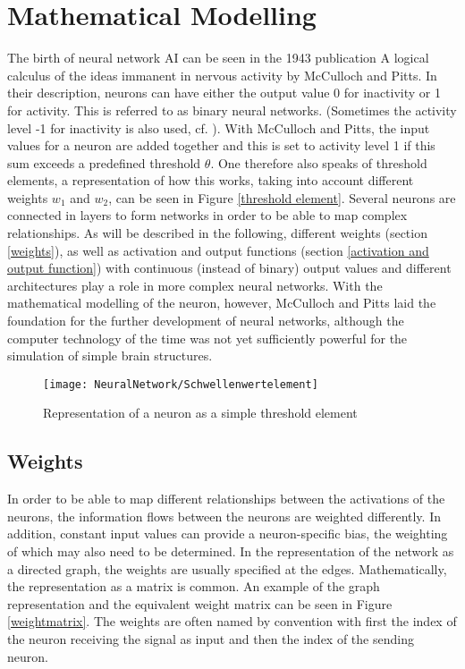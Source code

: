 \section{Mathematical Modelling} 

The birth of neural network AI can be seen in the 1943 publication \glqq A logical calculus of the ideas immanent in nervous activity\grqq \cite{McCulloch:1943} by McCulloch and Pitts. In their description, neurons can have either the output value 0 for inactivity or 1 for activity. This is referred to as binary neural networks. (Sometimes the activity level -1 for inactivity is also used, cf. \cite{Ertel:2016}). With McCulloch and Pitts, the input values for a neuron are added together and this is set to activity level 1 if this sum exceeds a predefined threshold $\theta$. One therefore also speaks of \glqq threshold elements\grqq \cite{Kruse:2015}, a representation of how this works, taking into account different weights $w_1$ and $w_2$, can be seen in Figure \ref{threshold element}. Several neurons are connected in layers to form networks in order to be able to map complex relationships. As will be described in the following, different weights (section \ref{weights}), as well as activation and output functions (section \ref{activation and output function}) with continuous (instead of binary) output values and different architectures play a role in more complex neural networks. With the mathematical modelling of the neuron, however, McCulloch and Pitts laid the foundation for the further development of neural networks, although the computer technology of the time was not yet sufficiently powerful for the simulation of simple brain structures. \cite{Ertel:2016}

\begin{figure}[H]
	\begin{center}
		\texttt{[image: NeuralNetwork/Schwellenwertelement]}
		\caption{Representation of a neuron as a simple threshold element} 
		\label{Schwellenwertelement}
	\end{center}
\end{figure}

\subsection{Weights} \label{Gewichte}

In order to be able to map different relationships between the activations of the neurons, the information flows between the neurons are weighted differently. In addition, constant input values can provide a neuron-specific bias, the weighting of which may also need to be determined. \cite{Moeser:2018} In the representation of the network as a directed graph, the weights are usually specified at the edges.  Mathematically, the representation as a matrix is common. An example of the graph representation and the equivalent weight matrix can be seen in Figure \ref{weightmatrix}. The weights are often named by convention with first the index of the neuron receiving the signal as input and then the index of the sending neuron.

